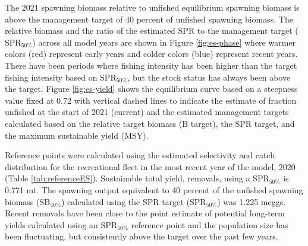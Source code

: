 \documentclass[11pt,
  english,
  a4paper,
]{article}
\begin{document}
\leavevmode\tagmcend\tagstructend


The 2021 spawning biomass relative to unfished equilibrium spawning biomass is above the management target of 40 percent of unfished spawning biomass. The relative biomass and the ratio of the estimated SPR to the management target ({\(\text{SPR}_{50\%}\)\leavevmode\tagmcend\tagstructend}) across all model years are shown in Figure \ref{fig:es-phase} where warmer colors (red) represent early years and colder colors (blue) represent recent years. There have been periods where fishing intensity has been higher than the target fishing intensity based on {\(\text{SPR}_{50\%}\)\leavevmode\tagmcend\tagstructend}, but the stock status has always been above the target. Figure \ref{fig:es-yield} shows the equilibrium curve based on a steepness value fixed at 0.72 with vertical dashed lines to indicate the estimate of fraction unfished at the start of 2021 (current) and the estimated management targets calculated based on the relative target biomass (B target), the SPR target, and the maximum sustainable yield (MSY).

\leavevmode\tagmcend\tagstructend\par


Reference points were calculated using the estimated selectivity and catch distribution for the recreational fleet in the most recent year of the model, 2020 (Table \ref{tab:referenceES}). Sustainable total yield, removals, using a {\(\text{SPR}_{50\%}\)\leavevmode\tagmcend\tagstructend} is 0.771 mt. The spawning output equivalent to 40 percent of the unfished spawning biomass ({\(\text{SB}_{40\%}\)\leavevmode\tagmcend\tagstructend}) calculated using the SPR target ({\(\text{SPR}_{50\%}\)\leavevmode\tagmcend\tagstructend}) was 1.225 meggs. Recent removals have been close to the point estimate of potential long-term yields calculated using an {\(\text{SPR}_{50\%}\)\leavevmode\tagmcend\tagstructend} reference point and the population size has been fluctuating, but consistently above the target over the past few years.
\end{document}

